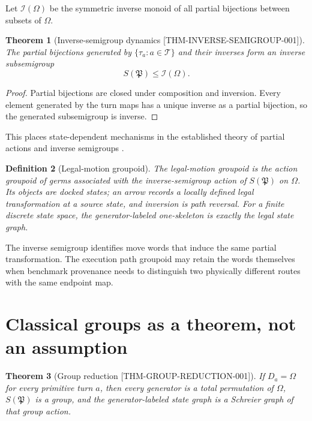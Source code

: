\documentclass[11pt,openany]{book}
\newcommand{\Atlas}{\mathfrak P}
\newcommand{\States}{\Omega}
\newcommand{\Turns}{\mathcal T}
\newcommand{\claimid}[1]{\textnormal{\sffamily\footnotesize[#1]}}
\theoremstyle{polyplain}
\newtheorem{theorem}{Theorem}[chapter]
\theoremstyle{polydef}
\newtheorem{definition}[theorem]{Definition}
\begin{document}
Let $\mathcal I(\States)$ be the symmetric inverse monoid of all partial bijections between subsets of $\States$.

\begin{theorem}[Inverse-semigroup dynamics \claimid{THM-INVERSE-SEMIGROUP-001}]
\label{thm:inverse-semigroup}
The partial bijections generated by $\{\tau_a:a\in\Turns\}$ and their inverses form an inverse subsemigroup
\[
S(\Atlas)\le\mathcal I(\States).
\]
\end{theorem}

\begin{proof}
Partial bijections are closed under composition and inversion. Every element generated by the turn maps has a unique inverse as a partial bijection, so the generated subsemigroup is inverse.
\end{proof}

This places state-dependent mechanisms in the established theory of partial actions and inverse semigroups \parencite{Exel1998,KellendonkLawson2004}.

\begin{definition}[Legal-motion groupoid]
\label{def:legal-motion-groupoid}
The \emph{legal-motion groupoid} is the action groupoid of germs associated with the inverse-semigroup action of $S(\Atlas)$ on $\States$. Its objects are docked states; an arrow records a locally defined legal transformation at a source state, and inversion is path reversal. For a finite discrete state space, the generator-labeled one-skeleton is exactly the legal state graph.
\end{definition}

The inverse semigroup identifies move words that induce the same partial transformation. The execution path groupoid may retain the words themselves when benchmark provenance needs to distinguish two physically different routes with the same endpoint map.

\section{Classical groups as a theorem, not an assumption}

\begin{theorem}[Group reduction \claimid{THM-GROUP-REDUCTION-001}]
\label{thm:group-reduction}
If $D_a=\States$ for every primitive turn $a$, then every generator is a total permutation of $\States$, $S(\Atlas)$ is a group, and the generator-labeled state graph is a Schreier graph of that group action.
\end{theorem}
\end{document}
